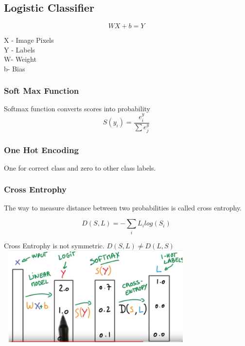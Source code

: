 \documentclass[a4paper,10pt]{article}
\begin{document}
\subsection{Logistic Classifier}

\begin{equation}\label{linear}
 WX +b =Y
\end{equation}
  
 X - Image Pixels \\
 Y - Labels\\
 W- Weight\\
 b- Bias\\
\subsubsection{Soft Max Function}

Softmax function converts scores into probability
\begin{equation}
 S(y_i) = \frac{e^y_i}{\displaystyle \sum e^y_j}
\end{equation}


\subsubsection{One Hot Encoding}

One for correct class and zero to other class labels.

\subsubsection{Cross Entrophy}

The way to measure distance between two probabilities is called cross entrophy.

\begin{equation}
 D(S,L) = -\displaystyle \sum_i L_i log(S_i) 
\end{equation}

Cross Entrophy is not symmetric. $D(S,L) \neq D(L,S) $\\

\includegraphics[width=10cm, height=5cm]{nnend2end}
\end{document}
